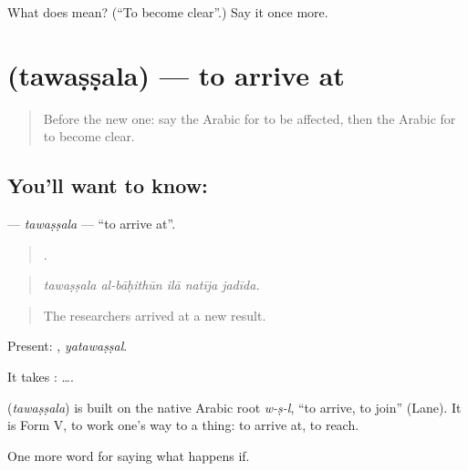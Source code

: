 \begin{tcolorbox}[breakable,colback=teal!4,colframe=teal!35!black,title={Before you move on}]
What does  mean? (\textquotedblleft{}To become clear\textquotedblright{}.) Say it once more.
\end{tcolorbox}
\section[\texorpdfstring{\ar{توصل} (tawaṣṣala)}{توصل (tawaṣṣala)}]{ (tawaṣṣala) — to arrive at}

\label{lesson:AR-C415-tawassala}



\begin{quote}
Before the new one: say the Arabic for to be affected, then the Arabic for to become clear.
\end{quote}

\subsection*{You'll want to know: }
\textbf{} — \emph{tawaṣṣala} — \textquotedblleft{}to arrive at\textquotedblright{}.

\begin{quote}
    .
\end{quote}

\begin{quote}
\emph{tawaṣṣala al-bāḥithūn ilā natīja jadīda.}
\end{quote}

\begin{quote}
The researchers arrived at a new result.
\end{quote}

Present: , \emph{yatawaṣṣal}.

It takes :   ….

\begin{cousinweb}
\textbf{} (\emph{tawaṣṣala}) is built on the native Arabic root \emph{w-ṣ-l}, \textquotedblleft{}to arrive, to join\textquotedblright{} (Lane). It is Form V, to work one's way to a thing: to arrive at, to reach.
\end{cousinweb}

\begin{grammarlens}[title={What you've built}]
One more word for saying what happens if.
\end{grammarlens}

